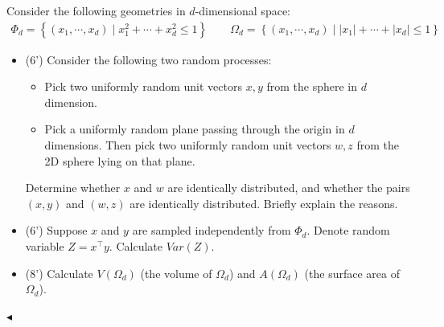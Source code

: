 \documentclass[11pt]{article}
\newenvironment{problem}[2][Problem]{\begin{trivlist}
\item[\hskip \labelsep {\bfseries #1}\hskip \labelsep {\bfseries #2.}]}{\hfill$\blacktriangleleft$\end{trivlist}}
\begin{document}
\begin{problem}{8 (20')} 
Consider the following geometries in $d$-dimensional space:
\begin{align*}
    \Phi_d=\left\{(x_1,\cdots,x_d)\mid x_1^2+\cdots+x_d^2\leq 1\right\}\qquad
    \Omega_d=\left\{(x_1,\cdots,x_d)\mid |x_1|+\cdots+|x_d|\leq 1\right\}
\end{align*}
\begin{itemize}
    \item [(1)] (6') Consider the following two random processes:
    \begin{itemize}
        \item Pick two uniformly random unit vectors $x,y$ from the sphere in $d$ dimension.
        \item Pick a uniformly random plane passing through the origin in $d$ dimensions. Then pick two uniformly random unit vectors $w,z$ from the 2D sphere lying on that plane.
    \end{itemize}
    Determine whether $x$ and $w$ are identically distributed, and whether the pairs $(x,y)$ and $(w,z)$ are identically distributed. Briefly explain the reasons.
    \item [(2)] (6') Suppose $x$ and $y$ are sampled independently from $\Phi_d$. Denote random variable $Z=x^\top y$. Calculate $Var(Z)$.
    \item [(3)] (8') Calculate $V(\Omega_d)$ (the volume of $\Omega_d$) and $A(\Omega_d)$ (the surface area of $\Omega_d$).
\end{itemize}
\end{problem}
\end{document}
